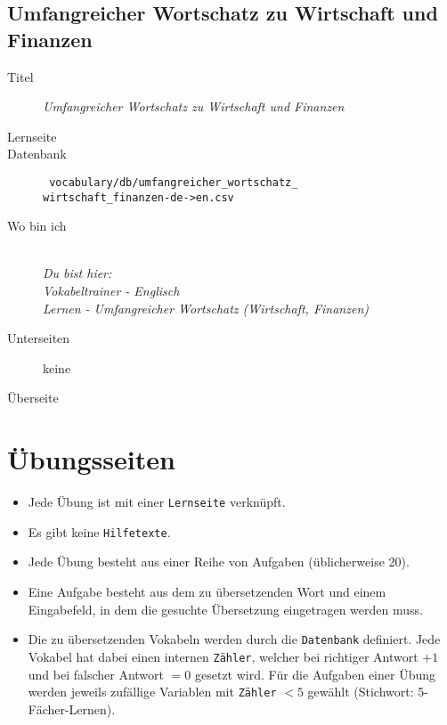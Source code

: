 \subsection{ Umfangreicher Wortschatz zu Wirtschaft und Finanzen }
\label{has:voc-learn-page5}
\begin{description}
	\item[Titel] \emph{ Umfangreicher Wortschatz zu Wirtschaft und Finanzen }
	\item[Lernseite] 
	\item[Datenbank] \texttt{ vocabulary/db/umfangreicher\_wortschatz\_\\wirtschaft\_finanzen-de->en.csv }
	\item[Wo bin ich] \emph{\\Du bist hier:\\Vokabeltrainer - Englisch\\Lernen - Umfangreicher Wortschatz (Wirtschaft, Finanzen)}
	\item[Unterseiten] keine
	\item[Überseite] 
\end{description}

\section{ Übungsseiten }
\label{has:voc-practice}

\begin{itemize}
	\item Jede Übung ist mit einer \texttt{Lernseite} verknüpft.
	\item Es gibt keine \texttt{Hilfetexte}.
	\item Jede Übung besteht aus einer Reihe von Aufgaben (üblicherweise 20).
	\item Eine Aufgabe besteht aus dem zu übersetzenden Wort und einem Eingabefeld, in dem die gesuchte Übersetzung eingetragen werden muss.
	\item Die zu übersetzenden Vokabeln werden durch die \texttt{Datenbank} definiert.
		Jede Vokabel hat dabei einen internen \texttt{Zähler}, welcher bei richtiger Antwort $+1$ und bei falscher Antwort $=0$ gesetzt wird.
		Für die Aufgaben einer Übung werden jeweils zufällige Variablen mit \texttt{Zähler} $<5$ gewählt (Stichwort: 5-Fächer-Lernen).

\end{itemize}

